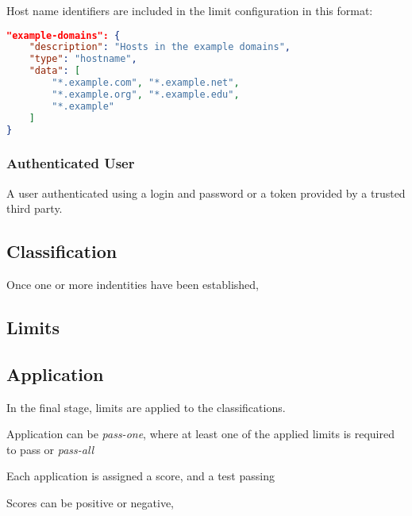 \documentclass[10pt,titlepage]{article}
\begin{document}
Host name identifiers are included in the limit configuration in this
format:

\begin{lstlisting}[language=json]
"example-domains": {
    "description": "Hosts in the example domains",
    "type": "hostname",
    "data": [
        "*.example.com", "*.example.net",
        "*.example.org", "*.example.edu",
        "*.example"
    ]
}
\end{lstlisting}




\subsubsection{Authenticated User}

A user authenticated using a login and password or a token provided by
a trusted third party.





\subsection{Classification}

Once one or more indentities have been established, 

\subsection{Limits}

\subsection{Application}

In the final stage, limits are applied to the classifications.

Application can be {\it pass-one}, where at least one of the applied limits is required to pass or {\it pass-all}

Each application is assigned a score, and a test passing 

Scores can be positive or negative, 
\end{document}

